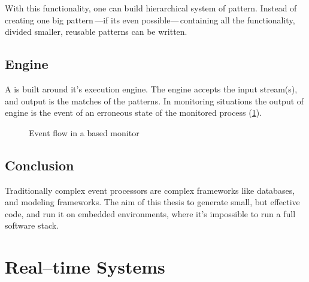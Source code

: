 With this functionality, one can build hierarchical system of pattern. Instead of creating one big pattern\,---if its even possible---\,containing all the functionality, divided smaller, reusable patterns can be written.

\subsection{Engine}

A \cep is built around it's execution engine. The engine accepts the input stream(s), and output is the matches of the patterns. In monitoring situations the output of engine is the event of an erroneous state of the monitored process (\cref{fig:cep_monitoring_event_flow}).

\begin{figure}[!h]
	\centering
	\caption{Event flow in a \cep based monitor}
	\label{fig:cep_monitoring_event_flow}
\end{figure}

\subsection{Conclusion}

Traditionally complex event processors are complex frameworks like databases, and modeling frameworks. The aim of this thesis to generate small, but effective code, and run it on embedded environments, where it's impossible to run a full \cep software stack.

\section{Real--time Systems}

